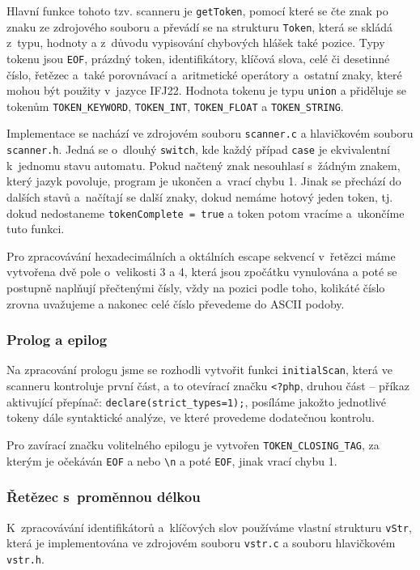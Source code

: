 \documentclass[a4paper,12pt]{article}
\begin{document}
Hlavní funkce tohoto tzv. scanneru je \verb|getToken|, pomocí které se čte znak po znaku ze zdrojového souboru a převádí se na strukturu \verb|Token|, která se skládá z~typu, hodnoty a z~důvodu vypisování chybových hlášek také pozice. Typy tokenu jsou \verb|EOF|, prázdný token, identifikátory, klíčová slova, celé či desetinné číslo, řetězec a~také porovnávací a~aritmetické operátory a~ostatní znaky, které mohou být použity v~jazyce IFJ22. Hodnota tokenu je typu \verb|union| a přiděluje se tokenům \verb|TOKEN_KEYWORD|, \verb|TOKEN_INT|, \verb|TOKEN_FLOAT| a \verb|TOKEN_STRING|.
 
Implementace se nachází ve zdrojovém souboru \verb|scanner.c| a hlavičkovém souboru \verb|scanner.h|. Jedná se o~dlouhý \verb|switch|, kde každý případ \verb|case| je ekvivalentní k~jednomu stavu automatu. Pokud načtený znak nesouhlasí s~žádným znakem, který jazyk povoluje, program je ukončen a~vrací chybu 1. Jinak se přechází do dalších stavů a~načítají se další znaky, dokud nemáme hotový jeden token, tj. dokud nedostaneme \verb|tokenComplete = true| a token potom vracíme a~ukončíme tuto funkci.


Pro zpracovávání hexadecimálních a oktálních escape sekvencí v~řetězci máme vytvořena dvě pole o~velikosti 3 a 4, která jsou zpočátku vynulována a poté se postupně
naplňují přečtenými čísly, vždy na pozici podle toho, kolikáté číslo zrovna uvažujeme a nakonec celé číslo převedeme do ASCII podoby.

\subsubsection{Prolog a epilog}
Na zpracování prologu jsme se rozhodli vytvořit funkci \verb|initialScan|, která ve scanneru kontroluje první část, a to otevírací značku \verb|<?php|, druhou část -- příkaz aktivující přepínač: \verb|declare(strict_types=1);|, posíláme jakožto jednotlivé tokeny dále syntaktické analýze, ve které provedeme dodatečnou kontrolu.

Pro zavírací značku volitelného epilogu je vytvořen \verb|TOKEN_CLOSING_TAG|, za kterým je očekáván \verb|EOF| a nebo \verb|\n| a poté \verb|EOF|, jinak vrací chybu 1.

\subsubsection{Řetězec s~proměnnou délkou}
K~zpracovávání identifikátorů a~klíčových slov používáme vlastní strukturu \verb|vStr|, která je implementována ve zdrojovém souboru \verb|vstr.c| a souboru hlavičkovém \verb|vstr.h|.
\end{document}
